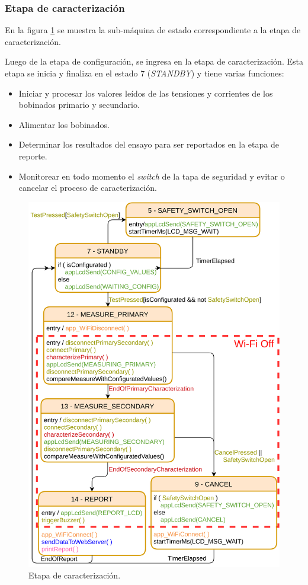 \subsubsection{Etapa de caracterización}
\label{subsubsec:EtTest}
En la figura \ref{fig:MainFSM_3} se muestra la sub-máquina de estado correspondiente a la etapa de caracterización. 

Luego de la etapa de configuración, se ingresa en la etapa de caracterización. Esta etapa se inicia y finaliza en el estado 7 (\textit{STANDBY}) y tiene varias funciones:

\begin{itemize}
\item Iniciar y procesar los valores leídos de las tensiones y corrientes de los bobinados primario y secundario.
\item Alimentar los bobinados.
\item Determinar los resultados del ensayo para ser reportados en la etapa de reporte.
\item Monitorear en todo momento el \textit{switch} de la tapa de seguridad y evitar o cancelar el proceso de caracterización.
\end{itemize}

\pagebreak

\begin{figure}[ht]
	\centering
	\includegraphics[scale=0.95]{./Figures/MainFSM_3.png}
	\caption{Etapa de caracterización.}
	\label{fig:MainFSM_3}
\end{figure}

